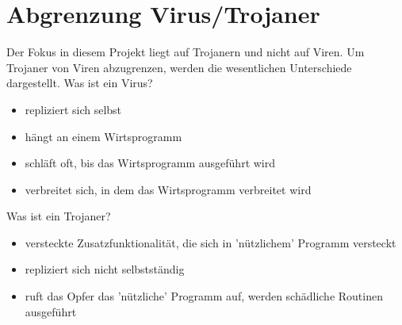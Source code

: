 \section{Abgrenzung Virus/Trojaner}\label{sec:abgrenzung}
Der Fokus in diesem Projekt liegt auf Trojanern und nicht auf Viren. 
Um Trojaner von Viren abzugrenzen, werden die wesentlichen Unterschiede dargestellt.
\break
Was ist ein Virus?
\begin{itemize}
    \item repliziert sich selbst
    \item hängt an einem Wirtsprogramm
    \item schläft oft, bis das Wirtsprogramm ausgeführt wird
    \item verbreitet sich, in dem das Wirtsprogramm verbreitet wird
\end{itemize}
Was ist ein Trojaner?
\begin{itemize}
    \item versteckte Zusatzfunktionalität, die sich in 'nützlichem' Programm versteckt
    \item repliziert sich nicht selbstständig
    \item ruft das Opfer das 'nützliche' Programm auf, werden schädliche Routinen ausgeführt
\end{itemize}